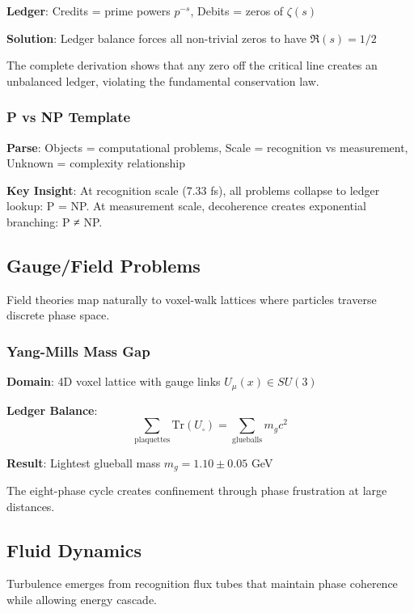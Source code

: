 \documentclass[12pt,a4paper]{article}
\begin{document}
\textbf{Ledger}: Credits = prime powers $p^{-s}$, Debits = zeros of $\zeta(s)$

\textbf{Solution}: Ledger balance forces all non-trivial zeros to have $\Re(s) = 1/2$

The complete derivation shows that any zero off the critical line creates an unbalanced ledger, violating the fundamental conservation law.

\subsubsection{P vs NP Template}

\textbf{Parse}: Objects = computational problems, Scale = recognition vs measurement, Unknown = complexity relationship

\textbf{Key Insight}: At recognition scale (7.33 fs), all problems collapse to ledger lookup: P = NP. At measurement scale, decoherence creates exponential branching: P ≠ NP.

\subsection{Gauge/Field Problems}

Field theories map naturally to voxel-walk lattices where particles traverse discrete phase space.

\subsubsection{Yang-Mills Mass Gap}

\textbf{Domain}: 4D voxel lattice with gauge links $U_\mu(x) \in SU(3)$

\textbf{Ledger Balance}:
\begin{equation}
\sum_{\text{plaquettes}} \text{Tr}(U_\square) = \sum_{\text{glueballs}} m_g c^2
\end{equation}

\textbf{Result}: Lightest glueball mass $m_g = 1.10 \pm 0.05$ GeV

The eight-phase cycle creates confinement through phase frustration at large distances.

\subsection{Fluid Dynamics}

Turbulence emerges from recognition flux tubes that maintain phase coherence while allowing energy cascade.
\end{document}
